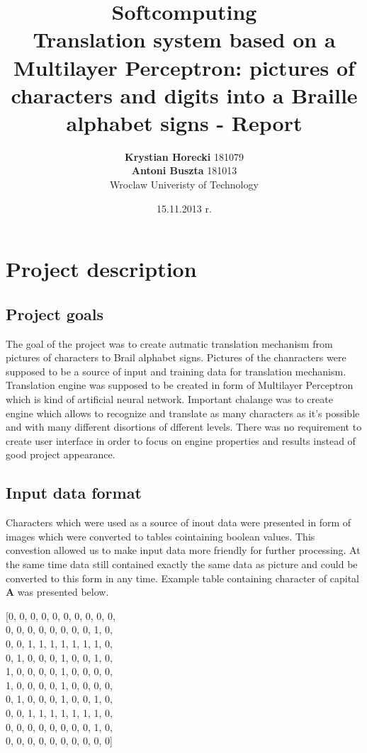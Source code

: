 \documentclass[a4paper]{article}
\title{Softcomputing \\ Translation system based on a Multilayer Perceptron: pictures of characters and digits into a Braille alphabet
signs - Report}
\author{\textbf{Krystian Horecki} 181079 \\ 
	\textbf{Antoni Buszta} 181013 \\
	Wroclaw Univeristy of Technology}
\date{15.11.2013 r.}
\begin{document}
\maketitle
\newpage
\onehalfspace

\section{Project description}
\subsection{Project goals} 
The goal of the project was to create autmatic translation mechanism from pictures of characters to Brail alphabet signs.
Pictures of the chanracters were supposed to be a source of input and training data for translation mechanism.
Translation engine was supposed to be created in form of Multilayer Perceptron which is kind of artificial neural network.
Important chalange was to create engine which allows to recognize and translate as many characters as it's possible and with many different disortions of dfferent levels.
There was no requirement to create user interface in order to focus on engine properties and results instead of good project appearance.
\subsection{Input data format}
Characters which were used as a source of inout data were presented in form of images which were converted to tables cointaining boolean values.
This convestion allowed us to make input data more friendly for further processing. At the same time data still contained exactly the same data as picture and could be converted to this form in any time.
Example table containing character of capital \textbf{A} was presented below. \\
\begin{center}
		[0, 0, 0, 0, 0, 0, 0, 0, 0, 0,\\
        0, 0, 0, 0, 0, 0, 0, 0, 1, 0,\\
        0, 0, 1, 1, 1, 1, 1, 1, 1, 0,\\
        0, 1, 0, 0, 0, 1, 0, 0, 1, 0,\\
        1, 0, 0, 0, 0, 1, 0, 0, 0, 0,\\
        1, 0, 0, 0, 0, 1, 0, 0, 0, 0,\\
        0, 1, 0, 0, 0, 1, 0, 0, 1, 0,\\
        0, 0, 1, 1, 1, 1, 1, 1, 1, 0,\\
        0, 0, 0, 0, 0, 0, 0, 0, 1, 0,\\
        0, 0, 0, 0, 0, 0, 0, 0, 0, 0]\\
\end{center}
 
\end{document}
